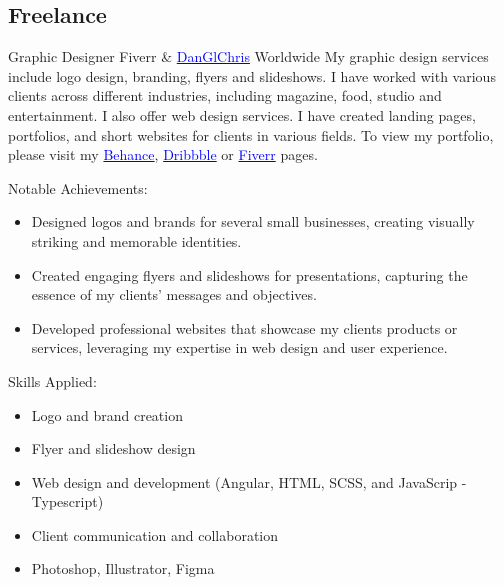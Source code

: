 \subsection{\textbf{Freelance}}

    {Graphic Designer}
    {Fiverr \& \href{https://danglchris.netlify.app/}{\textcolor{blue}{DanGlChris}}}
    {Worldwide}
    {
    \newline
    My graphic design services include logo design, branding, flyers and slideshows. I have worked with various clients across different industries, including magazine, food, studio and entertainment. 
    \newline
    I also offer web design services. I have created landing pages, portfolios, and short websites for clients in various fields.
    To view my portfolio, please visit my \href{https://www.behance.net/kankwandadaglox}{\textcolor{blue}{Behance}}, \href{https://dribbble.com/DanGlChris}{\textcolor{blue}{Dribbble}} or 
    \href{https://www.fiverr.com/danglchris/design-in-one-day-a-professional-creative-minimalist-logo-634d?utm_campaign=gigs_show&utm_medium=shared&utm_source=copy_link&utm_term=plvgj8}{\textcolor{blue}{Fiverr}} pages.
    } 
    {\newline
    Notable Achievements:
    \begin{itemize}
        \item Designed logos and brands for several small businesses, creating visually striking and memorable identities.
        \item Created engaging flyers and slideshows for presentations, capturing the essence of my clients' messages and objectives.
        \item Developed professional websites that showcase my clients products or services, leveraging my expertise in web design and user experience.
    \end{itemize}
    \vspace{1mm}
    Skills Applied:
    \begin{itemize}
        \item Logo and brand creation
        \item Flyer and slideshow design
        \item Web design and development (Angular, HTML, SCSS, and JavaScrip - Typescript)
        \item Client communication and collaboration
        \item Photoshop, Illustrator, Figma
    \end{itemize}
    }

